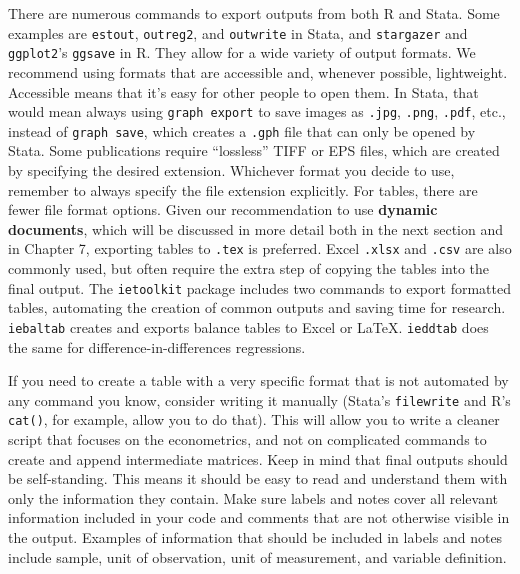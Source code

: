 There are numerous commands to export outputs from both R and Stata.
Some examples are \texttt{estout},
\texttt{outreg2},
and \texttt{outwrite} in Stata,
and \texttt{stargazer}
and \texttt{ggplot2}'s \texttt{ggsave} in R.
They allow for a wide variety of output formats. We recommend using formats that are accessible and, whenever possible, lightweight.
Accessible means that it's easy for other people to open them.
In Stata, that would mean always using \texttt{graph export} to save images as
\texttt{.jpg}, \texttt{.png}, \texttt{.pdf}, etc.,
instead of \texttt{graph save},
which creates a \texttt{.gph} file that can only be opened by Stata.
Some publications require ``lossless'' TIFF or EPS files,
which are created by specifying the desired extension.
Whichever format you decide to use,
remember to always specify the file extension explicitly.
For tables, there are fewer file format options.
Given our recommendation to use \textbf{dynamic documents},
which will be discussed in more detail both in the next section and in Chapter 7,
exporting tables to \texttt{.tex} is preferred.
Excel \texttt{.xlsx} and \texttt{.csv} are also commonly used,
but often require the extra step of copying the tables into the final output.
The \texttt{ietoolkit} package includes two commands to export formatted tables,
automating the creation of common outputs and saving time for research.
\texttt{iebaltab} creates and exports balance tables to Excel or {\LaTeX}.
\texttt{ieddtab} does the same for difference-in-differences regressions.

If you need to create a table with a very specific format
that is not automated by any command you know, consider writing it manually
(Stata's \texttt{filewrite} and R's \texttt{cat()}, for example, allow you to do that).
This will allow you to write a cleaner script that focuses on the econometrics,
and not on complicated commands to create and append intermediate matrices.
Keep in mind that final outputs should be self-standing.
This means it should be easy to read and understand them with only the information they contain.
Make sure labels and notes cover all relevant information
included in your code and comments that are not otherwise visible in the output.
Examples of information that should be included in labels and notes include sample,
unit of observation, unit of measurement, and variable definition.

